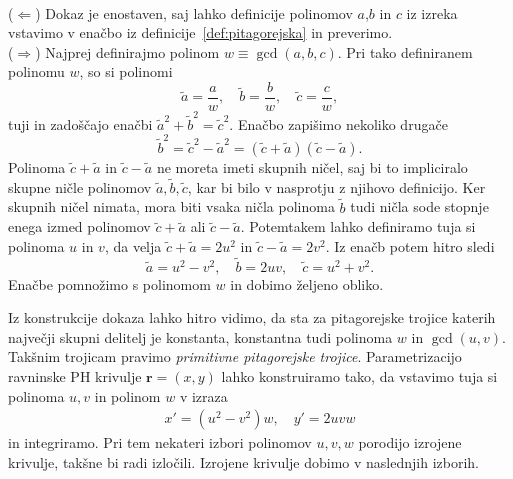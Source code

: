 \documentclass[isrm2, tisk]{fmfdelo}
\begin{document}
    \begin{dokaz}
        \mbox{}\\
        ($\Leftarrow$) Dokaz je enostaven, saj lahko definicije polinomov $a$,$b$ in $c$ iz izreka vstavimo v enačbo iz definicije~\ref{def:pitagorejska} in preverimo. \\
        ($\Rightarrow$) Najprej definirajmo polinom $w\equiv \gcd(a,b,c)$.
        Pri tako definiranem polinomu $w$, so si polinomi \[\tilde{a}=\frac{a}{w},\quad \tilde{b}=\frac{b}{w},\quad \tilde{c}=\frac{c}{w},\] tuji in zadoščajo enačbi $\tilde{a}^2+\tilde{b}^2=\tilde{c}^2$.
        Enačbo zapišimo nekoliko drugače \[\tilde{b}^2= \tilde{c}^2-\tilde{a}^2 = (\tilde{c}+\tilde{a})(\tilde{c}-\tilde{a}).\]
        Polinoma $\tilde{c}+\tilde{a}$ in $\tilde{c}-\tilde{a}$ ne moreta imeti skupnih ničel, saj bi to impliciralo skupne ničle polinomov $\tilde{a},\tilde{b},\tilde{c}$, kar bi bilo v nasprotju z njihovo definicijo.
        Ker skupnih ničel nimata, mora biti vsaka ničla polinoma $\tilde{b}$ tudi ničla sode stopnje enega izmed polinomov $\tilde{c}+\tilde{a}$ ali $\tilde{c}-\tilde{a}$.
        Potemtakem lahko definiramo tuja si polinoma $u$ in $v$, da velja $\tilde{c}+\tilde{a}=2u^2$ in $\tilde{c}-\tilde{a}=2v^2$.
        Iz enačb potem hitro sledi \[\tilde{a}=u^2-v^2,\quad\tilde{b}=2uv, \quad\tilde{c}=u^2+v^2.\]
        Enačbe pomnožimo s polinomom $w$ in dobimo željeno obliko. \qedhere
    \end{dokaz}
    \noindent Iz konstrukcije dokaza lahko hitro vidimo, da sta za pitagorejske trojice katerih največji skupni delitelj je konstanta, konstantna tudi polinoma $w$ in $\gcd(u,v)$.
    Takšnim trojicam pravimo \textit{primitivne pitagorejske trojice}.
    Parametrizacijo ravninske PH krivulje $\mathbf{r}=(x,y)$ lahko konstruiramo tako, da vstavimo tuja si polinoma $u,v$ in polinom $w$ v izraza
    \begin{align}
        x'=(u^2-v^2)w,\quad y'=2uvw  \label{eq:hodograf-splosni}
    \end{align} in integriramo.
    Pri tem nekateri izbori polinomov $u,v,w$ porodijo izrojene krivulje, takšne bi radi izločili.
    Izrojene krivulje dobimo v naslednjih izborih.
\end{document}
